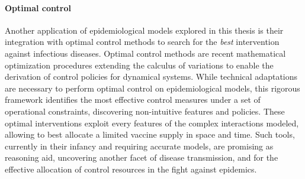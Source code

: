 \paragraph{Optimal control} Another application of epidemiological models explored in this thesis is their integration with optimal control methods to search for the \textit{best} intervention against infectious diseases. Optimal control methods are recent mathematical optimization procedures extending the calculus of variations to enable the derivation of control policies for dynamical systems. While technical adaptations are necessary to perform optimal control on epidemiological models, this rigorous framework identifies the most effective control measures under a set of operational constraints, discovering non-intuitive features and policies. These optimal interventions exploit every features of the complex interactions modeled, allowing to \eg best allocate a limited vaccine supply in space and time. Such tools, currently in their infancy and requiring accurate models, are promising as reasoning aid, uncovering another facet of disease transmission, and for the effective allocation of control resources in the fight against epidemics.




